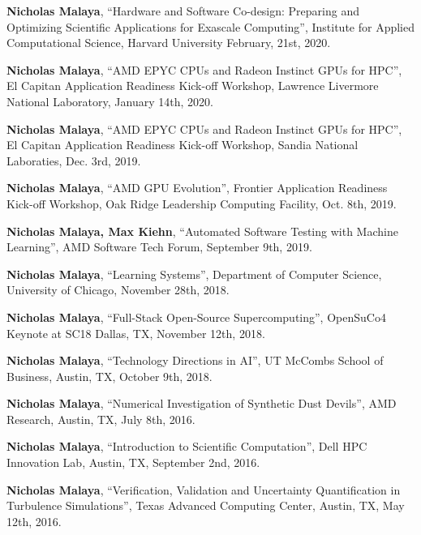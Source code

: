 
\textbf{Nicholas Malaya}, ``Hardware and Software Co-design: Preparing and Optimizing Scientific Applications for Exascale Computing'', Institute for Applied Computational Science, Harvard University
		 February, 21st, 2020. 

\blankline

\textbf{Nicholas Malaya}, ``AMD EPYC CPUs and Radeon Instinct GPUs for HPC'', El Capitan Application Readiness Kick-off Workshop, Lawrence Livermore National Laboratory, 
		 January 14th, 2020. 

\blankline

\textbf{Nicholas Malaya}, ``AMD EPYC CPUs and Radeon Instinct GPUs for HPC'', El Capitan Application Readiness Kick-off Workshop, Sandia National Laboraties, 
		 Dec. 3rd, 2019. 

\blankline

\textbf{Nicholas Malaya}, ``AMD GPU Evolution'', Frontier Application Readiness Kick-off Workshop, Oak Ridge Leadership Computing Facility, 
		 Oct. 8th, 2019. 

\blankline

\textbf{Nicholas Malaya, Max Kiehn}, ``Automated Software Testing with Machine Learning'', AMD Software Tech Forum, 
		 September 9th, 2019. 

\blankline

\textbf{Nicholas Malaya}, ``Learning Systems'', Department of Computer Science, 
		 University of Chicago, November 28th, 2018. 

\blankline

\textbf{Nicholas Malaya}, ``Full-Stack Open-Source Supercomputing'', OpenSuCo4 Keynote at SC18
		 Dallas, TX, November 12th, 2018. 

\blankline


\textbf{Nicholas Malaya}, ``Technology Directions in AI'', UT McCombs School of Business, 
		 Austin, TX, October 9th, 2018. 

\blankline

\textbf{Nicholas Malaya}, ``Numerical Investigation of Synthetic Dust Devils'', AMD Research, 
		 Austin, TX, July 8th, 2016. 

\blankline

\textbf{Nicholas Malaya}, ``Introduction to Scientific Computation'', Dell HPC Innovation Lab, 
		 Austin, TX, September 2nd, 2016. 

\blankline

\textbf{Nicholas Malaya}, ``Verification, Validation and Uncertainty Quantification in Turbulence Simulations'', Texas Advanced Computing Center, 
		 Austin, TX, May 12th, 2016. 


